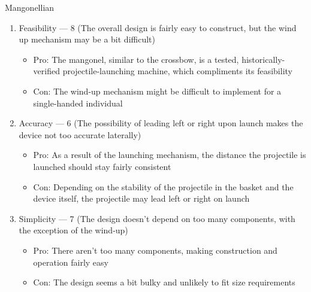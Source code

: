 \begin{center}
  Mangonellian
\end{center}

\begin{enumerate}

  \item Feasibility — 8 (The overall design is fairly easy to construct, but the wind up mechanism may be a bit difficult)

    \begin{itemize}

      \item Pro: The mangonel, similar to the crossbow, is a tested, historically-verified projectile-launching machine, which compliments its feasibility 

      \item Con: The wind-up mechanism might be difficult to implement for a single-handed individual

    \end{itemize}

  \item Accuracy — 6 (The possibility of leading left or right upon launch makes the device not too accurate laterally)

    \begin{itemize}

      \item Pro: As a result of the launching mechanism, the distance the projectile is launched should stay fairly consistent

      \item Con: Depending on the stability of the projectile in the basket and the device itself, the projectile may lead left or right on launch

    \end{itemize}

  \item Simplicity — 7 (The design doesn't depend on too many components, with the exception of the wind-up)

    \begin{itemize}

      \item Pro: There aren't too many components, making construction and operation fairly easy

      \item Con: The design seems a bit bulky and unlikely to fit size requirements

    \end{itemize}


\end{enumerate}
